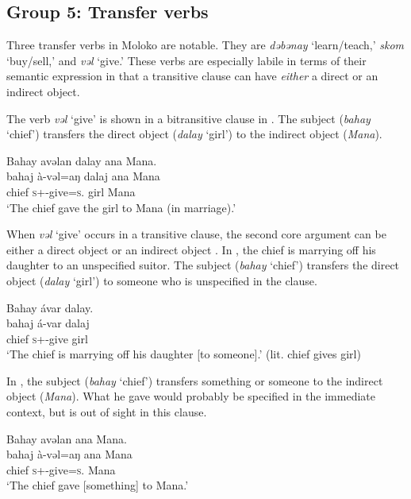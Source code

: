\subsection{Group 5: Transfer verbs}\label{sec:9.2.5}
\hypertarget{RefHeading1212741525720847}{}
Three transfer verbs in Moloko are notable. They are \textit{dəbənay} ‘learn/teach,’ \textit{skom} ‘buy/sell,’ and \textit{vəl}  ‘give.’ These verbs are especially labile in terms of their semantic expression in that a transitive clause can have \textit{either} a direct or an indirect object. 

The verb \textit{vəl}  ‘give’ is shown in a bitransitive clause in . The subject (\textit{bahay} ‘chief’) transfers the direct object (\textit{dalay}  ‘girl’) to the indirect object (\textit{Mana}).

\ea \label{ex:9:33}
Bahay  avəlan  dalay  ana  Mana.\\
\gll  bahaj   à-vəl=aŋ     dalaj   ana   Mana\\
      chief  \textsc{s}+{\PFV}-give=\textsc{s}.{\IO}  girl  {\DAT} Mana\\
\glt  ‘The chief gave the girl to Mana (in marriage).’ 
\z

When \textit{vəl}  ‘give’ occurs in a transitive clause, the second core argument can be either a direct object  or an indirect object .  In , the chief is marrying off his daughter to an unspecified suitor. The subject (\textit{bahay}  ‘chief’) transfers the direct object (\textit{dalay}  ‘girl’) to someone who is unspecified in the clause. 

\ea \label{ex:9:34}
Bahay  ávar  dalay.\\
\gll  bahaj    á-var      dalaj\\
      chief  \textsc{s}+{\IFV}-give  girl\\
\glt   ‘The chief is marrying off his daughter [to someone].’ (lit. chief gives girl) 
\z

In , the subject (\textit{bahay}  ‘chief’) transfers something or someone to the indirect object (\textit{Mana}). What he gave would probably be specified in the immediate context, but is out of sight in this clause.

\ea \label{ex:9:35}
Bahay  avəlan  ana  Mana.\\
\gll  bahaj   à-vəl=aŋ   ana   Mana\\
      chief  \textsc{s}+{\PFV}-give=\textsc{s}.{\IO}  {\DAT} Mana\\
\glt  ‘The chief gave [something] to Mana.’
\z

